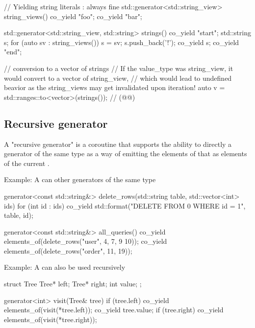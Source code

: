\documentclass{wg21}
\begin{document}
\begin{colorblock}

// Yielding string literals : always fine
std::generator<std::string_view> string_views() {
    co_yield "foo";
    co_yield "bar";
}

std::generator<std::string_view, std::string> strings() {
    co_yield "start";
    std::string s;
    for (auto sv : string_views()) {
        s = sv;
        s.push_back('!');
        co_yield s;
    }
    co_yield "end";
}

// conversion to a vector of strings
// If the value_type was string_view, it would convert to a vector of string_view,
// which would lead to undefined beavior as the string_views may get invalidated upon iteration!
auto v = std::ranges::to<vector>(strings()); // (@{}@)

\end{colorblock}


\subsection{Recursive generator}

A "recursive generator" is a coroutine that supports the ability to directly 
a generator of the same type as a way of emitting the elements of that 
as elements of the current .

Example: A  can  other generators of the same type
\begin{colorblock}
    generator<const std::string&> delete_rows(std::string table, std::vector<int> ids) {
        for (int id : ids) {
            co_yield std::format("DELETE FROM {0} WHERE id = {1}", table, id);
        }
    }
    
    generator<const std::string&> all_queries() {
        co_yield elements_of(delete_rows("user", {4, 7, 9 10}));
        co_yield elements_of(delete_rows("order", {11, 19}));
    }
\end{colorblock}

Example: A  can also be used recursively
\begin{colorblock}
    struct Tree {
        Tree* left;
        Tree* right;
        int value;
    };
    
    generator<int> visit(Tree& tree) {
        if (tree.left) co_yield elements_of(visit(*tree.left));
        co_yield tree.value;
        if (tree.right) co_yield elements_of(visit(*tree.right));
    }
\end{colorblock}
\end{document}
